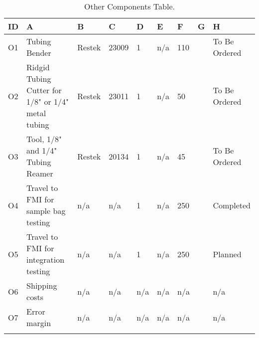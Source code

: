 {\color{blue}\begin{longtable} {|m{}|m{}|m{}|m{}|m{}|m{}|m{}|m{}|m{}|} \hline \textbf{ID} & \textbf{A} & \textbf{B} & \textbf{C} & \textbf{D} & \textbf{E} & \textbf{F}  & \textbf{G}  & \textbf{H} \\ \hline O1 & Tubing Bender & Restek & 23009 & 1 & n/a & 110 &  & To Be Ordered \\ \hline O2 & Ridgid Tubing Cutter for 1/8" or 1/4" metal tubing & Restek & 23011 & 1 & n/a & 50 &  & To Be Ordered \\ \hline O3 & Tool, 1/8" and 1/4" Tubing Reamer & Restek & 20134 & 1 & n/a & 45 &  & To Be Ordered \\ \hline O4 & Travel to FMI for sample bag testing & n/a & n/a & 1 & n/a & 250 &  & Completed \\ \hline O5 & Travel to FMI for integration testing & n/a & n/a & 1 & n/a & 250 &  & Planned \\ \hline O6 & Shipping costs & n/a & n/a & n/a & n/a & n/a &  & n/a \\ \hline O7 & Error margin & n/a & n/a & n/a & n/a & n/a &  & n/a \\ \hline \caption{Other Components Table.} \label{tab:component-table-other} \end{longtable}} \raggedbottom